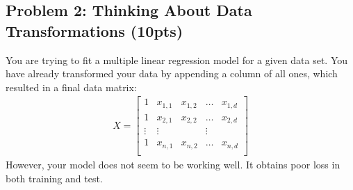 \documentclass[10pt]{article}
\begin{document}
\subsection{Problem 2: Thinking About Data Transformations (10pts)}
You are trying to fit a multiple linear regression model for a given data set. You have already transformed your data by appending a column of all ones, which resulted in a final data matrix:
\begin{align*}
X = \begin{bmatrix}
1 & x_{1,1} & x_{1,2} & \ldots & x_{1,d} \\
1 & x_{2,1} & x_{2,2} & \ldots & x_{2,d} \\
\vdots & \vdots & & \vdots\\
1 & x_{n,1} & x_{n,2} & \ldots & x_{n,d} \\
\end{bmatrix}
\end{align*}
However, your model does not seem to be working well. It obtains poor loss in both training and test. 
\end{document}
